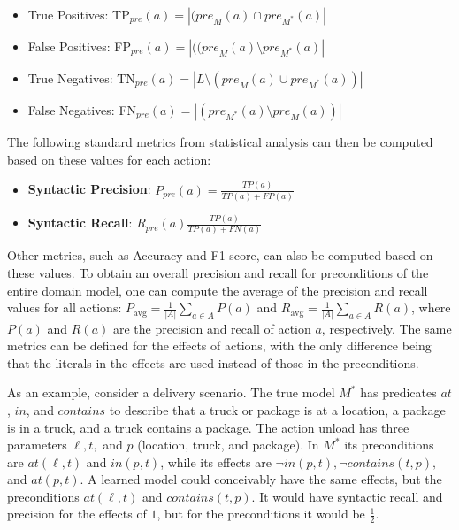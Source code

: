 \documentclass{article}
\theoremstyle{definition}
\theoremstyle{remark}
\newcommand{\realm}{{\ensuremath{M^*}}\xspace}
\newcommand{\pre}{\ensuremath{\textit{pre}}\xspace}
\newcommand{\eff}{\ensuremath{\textit{eff}}\xspace}
\newif\ifaddcomments
\newcommand{\roni}[1]{\ifaddcomments{\textcolor{red}{[Roni: #1]}}\fi}
\newcommand{\gregor}[1]{\ifaddcomments{\textcolor{orange}{[Gregor: #1]}}\fi}
\begin{document}
 \begin{itemize}
    \item True Positives: TP$_\pre(a)=|(\pre_M(a)\cap \pre_\realm(a)|$
    \item False Positives: FP$_\pre(a)=|((\pre_M(a)\setminus \pre_\realm(a)|$
    \item True Negatives: TN$_\pre(a)=|L \setminus(\pre_M(a)\cup \pre_\realm(a))|$
    \item False Negatives: FN$_\pre(a)=|(\pre_\realm(a)\setminus \pre_M(a))|$
\end{itemize}
The following standard metrics from statistical analysis can then be computed based on these values for each action:
\begin{itemize}
    \item \textbf{Syntactic Precision}: $P_\pre(a)=\frac{TP(a)}{TP(a)+FP(a)}$
    \item \textbf{Syntactic Recall}: $R_\pre(a)\frac{TP(a)}{TP(a)+FN(a)}$
\end{itemize}
Other metrics, such as Accuracy and F1-score, can also be computed based on these values. 
To obtain an overall precision and recall for preconditions of the entire domain model, one can compute the average of the precision and recall values for all actions:
$P_\text{avg}=\frac{1}{|A|}\sum_{a\in A} P(a)$ and $R_\text{avg}=\frac{1}{|A|}\sum_{a\in A} R(a)$, where $P(a)$ and $R(a)$ are the precision and recall of action $a$, respectively. 
The same metrics can be defined for the effects of actions, with the only difference being that the literals in the effects are used instead of those in the preconditions. 

\roni{TODO: Add an example}
\gregor{Proposed this ``pathological'' example}
\roni{Not sure about this. It is just an example, not a "corner case".}
As an example, consider a delivery scenario.
The true model $\realm$ has predicates $at$, $in$, and $contains$ to describe that a truck or package is at a location, a package is in a truck, and a truck contains a package.
The action unload has three parameters $\ell, t,$ and $p$ (location, truck, and package).
In $\realm$ its preconditions are $at(\ell, t)$ and $in(p,t)$, while its effects are $\neg in(p,t), \neg contains(t,p),$ and $at(p,t)$.
A learned model could conceivably have the same effects, but the preconditions $at(\ell, t)$ and $contains(t,p)$.
It would have syntactic recall and precision for the effects of $1$, but for the preconditions it would be $\frac 1 2$.
\end{document}
